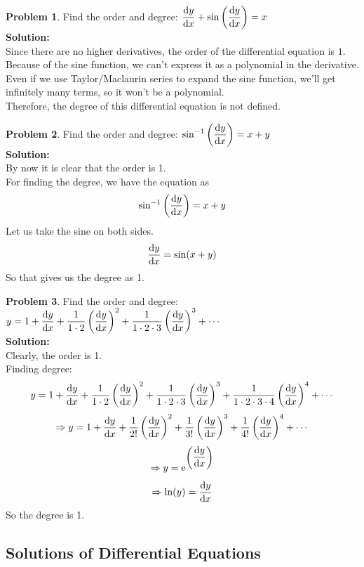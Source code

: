 \documentclass[14]{article}
\theoremstyle{definition}
\newtheorem{prob}{Problem}
\theoremstyle{case}
\begin{document}
\pagebreak
\begin{prob}
Find the order and degree: $\dfrac{\dif y}{\dif x} + \sin\left( \dfrac{\dif y}{\dif x} \right) = x$\\
\textbf{Solution:}\\
Since there are no higher derivatives, the order of the differential equation is $1$.\\
Because of the sine function, we can't express it as a polynomial in the derivative. Even if we use Taylor/Maclaurin series to expand the sine function, we'll get infinitely many terms, so it won't be a polynomial.\\
Therefore, the degree of this differential equation is not defined.
\end{prob}
\begin{prob}
Find the order and degree: $\sin^{-1}\left( \dfrac{\dif y}{\dif x} \right) = x + y$\\
\textbf{Solution:}\\
By now it is clear that the order is 1.\\
For finding the degree, we have the equation as
\[\sin^{-1}\left( \dfrac{\dif y}{\dif x} \right) = x + y\]
Let us take the sine on both sides.
\[\dfrac{\dif y}{\dif x} = \sin(x+y)\]
So that gives us the degree as 1.
\end{prob}
\begin{prob}
Find the order and degree: $y = 1 + \dfrac{\dif y}{\dif x} + \dfrac1{1\cdot 2} \left( \dfrac{\dif y}{\dif x} \right)^2 + \dfrac1{1\cdot 2 \cdot 3} \left(\dfrac{\dif y}{\dif x}\right)^3 + \cdots$\\
\textbf{Solution:}\\ Clearly, the order is 1.\\
Finding degree:\\
\[y = 1 + \dfrac{\dif y}{\dif x} + \dfrac1{1\cdot 2} \left( \dfrac{\dif y}{\dif x} \right)^2 + \dfrac1{1\cdot 2 \cdot 3} \left(\dfrac{\dif y}{\dif x}\right)^3 + \dfrac1{1\cdot 2 \cdot 3 \cdot 4} \left( \dfrac{\dif y}{\dif x} \right)^4 +  \cdots\]
\[\Rightarrow y = 1 + \dfrac{\dif y}{\dif x} + \dfrac1{2!} \left( \dfrac{\dif y}{\dif x} \right)^2 + \dfrac1{3!} \left(\dfrac{\dif y}{\dif x}\right)^3 + \dfrac1{4!} \left( \dfrac{\dif y}{\dif x} \right)^4 +  \cdots\]
\[\Rightarrow y = {\rm e}^{\left(\dfrac{\dif y}{\dif x}\right)}\]
\[\Rightarrow \ln(y) = \dfrac{\dif y}{\dif x}\]
So the degree is 1.
\end{prob}
\pagebreak
\subsection{Solutions of Differential Equations}
\end{document}
